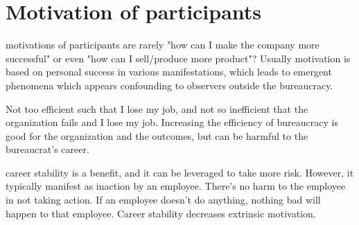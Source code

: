 \section{Motivation of participants}

motivations of participants are rarely "how can I make the company more successful" or even "how can I sell/produce more product"? Usually motivation is based on personal success in various manifestations, which leads to emergent phenomena which appears confounding to observers outside the bureaucracy. 

Not too efficient such that I lose my job, and not so inefficient that the organization fails and I lose my job. Increasing the efficiency of bureaucracy is good for the organization and the outcomes, but can be harmful to the bureaucrat's career.

career stability is a benefit, and it can be leveraged to take more risk. However, it typically manifest as inaction by an employee. There's no harm to the employee in not taking action. If an employee doesn't do anything, nothing bad will happen to that employee. Career stability decreases extrinsic motivation.